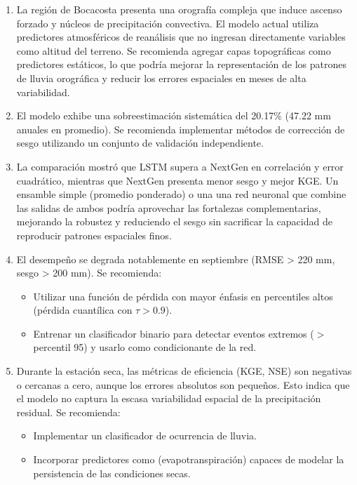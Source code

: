 \begin{enumerate}
	\item La región de Bocacosta presenta una orografía compleja que induce ascenso forzado y núcleos de precipitación convectiva. El modelo actual utiliza predictores atmosféricos de reanálisis que no ingresan directamente variables como altitud del terreno. Se recomienda agregar capas topográficas como predictores estáticos, lo que podría mejorar la representación de los patrones de lluvia orográfica y reducir los errores espaciales en meses de alta variabilidad.
	
	\item El modelo exhibe una sobreestimación sistemática del 20.17\% (47.22 mm anuales en promedio). Se recomienda implementar métodos de corrección de sesgo utilizando un conjunto de validación independiente.
	
	\item La comparación mostró que LSTM supera a NextGen en correlación y error cuadrático, mientras que NextGen presenta menor sesgo y mejor KGE. Un ensamble simple (promedio ponderado) o una una red neuronal que combine las salidas de ambos podría aprovechar las fortalezas complementarias, mejorando la robustez y reduciendo el sesgo sin sacrificar la capacidad de reproducir patrones espaciales finos.
	
	\item El desempeño se degrada notablemente en septiembre (RMSE > 220 mm, sesgo > 200 mm). Se recomienda:
	\begin{itemize}
		\item Utilizar una función de pérdida con mayor énfasis en percentiles altos (pérdida cuantílica con \(\tau > 0.9\)). 
		\item Entrenar un clasificador binario para detectar eventos extremos (\(>\) percentil 95) y usarlo como condicionante de la red.
	\end{itemize}
	
	\item Durante la estación seca, las métricas de eficiencia (KGE, NSE) son negativas o cercanas a cero, aunque los errores absolutos son pequeños. Esto indica que el modelo no captura la escasa variabilidad espacial de la precipitación residual. Se recomienda:
	\begin{itemize}
		\item Implementar un clasificador de ocurrencia de lluvia.
		\item Incorporar predictores como (evapotranspiración) capaces de modelar la persistencia de las condiciones secas.
	\end{itemize}
\end{enumerate}